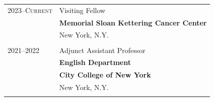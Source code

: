 \begin{longtable}{p{} p{} }

\textsc{2023--Current} & Visiting Fellow\\
& \textbf{Memorial Sloan Kettering Cancer Center} \\
& New York, N.Y. \\\\

\textsc{2021--2022} & Adjunct Assistant Professor\\
& \textbf{English Department} \\
& \textbf{City College of New York} \\
& New York, N.Y. \\\\

\end{longtable}


